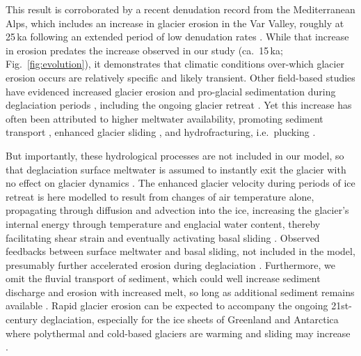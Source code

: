 \documentclass[esurf, manuscript]{copernicus}
\begin{document}
    This result is corroborated by a recent denudation record from the
    Mediterranean Alps, which includes an increase in glacier erosion in the
    Var Valley, roughly at 25\,ka following an extended period of low
    denudation rates \citep{Mariotti.etal.2021}. While that increase in
    erosion predates the increase observed in our study (ca.~15\,ka;
    Fig.~\ref{fig:evolution}), it demonstrates that climatic conditions
    over-which glacier erosion occurs are relatively specific and likely
    transient. Other field-based studies have evidenced increased glacier
    erosion and pro-glacial sedimentation during deglaciation periods
    \citep[e.g.,][]{Koppes.Montgomery.2009, Micheletti.Lane.2016,
    Lane.etal.2017}, including the ongoing glacier retreat
    \citep[e.g.,][]{Bendixen.etal.2017}. Yet this increase has often been
    attributed to higher meltwater availability, promoting sediment transport
    \citep{Delaney.Adhikari.2020}, enhanced glacier sliding
    \citep{Herman.etal.2011}, and hydrofracturing, i.e.~plucking
    \citep{Hallet.1996, Ugelvig.etal.2018, Hildes.etal.2004}.

    But importantly, these hydrological processes are not included in our
    model, so that deglaciation surface meltwater is assumed to instantly exit
    the glacier with no effect on glacier dynamics \citep[cf.][for comparison]
    {Werder.etal.2013, Iverson.2012, Ugelvig.etal.2018}. The enhanced glacier
    velocity during periods of ice retreat is here modelled to result from
    changes of air temperature alone, propagating through diffusion and
    advection into the ice, increasing the glacier's internal energy through
    temperature and englacial water content, thereby facilitating shear strain
    and eventually activating basal sliding \citep[cf.][for the physics]
    {Aschwanden.etal.2012, Seguinot.etal.2016}. Observed feedbacks between
    surface meltwater and basal sliding, not included in the model, presumably
    further accelerated erosion during deglaciation \citep{Herman.etal.2011}.
    Furthermore, we omit the fluvial transport of sediment, which could well
    increase sediment discharge and erosion with increased melt, so long as
    additional sediment remains available \citep{Delaney.Adhikari.2020}. Rapid
    glacier erosion can be expected to accompany the ongoing 21st-century
    deglaciation, especially for the ice sheets of Greenland and
    Antarctica where polythermal and cold-based glaciers are warming and
    sliding may increase \citep[e.g.,][]{Moon.etal.2012, Overeem.etal.2017,
    Mouginot.etal.2019}.
\end{document}
